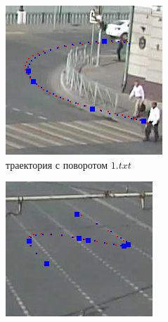 \begin{figure}[!htb]
\begin{subfigure}[!htb]{0.3\textwidth}
	\end{subfigure}
	\hfill
	\begin{subfigure}[!htb]{0.3\textwidth}
		\centering{}
		\includegraphics[width=\textwidth]{images/regr_kp_turn.png}
		\caption{траектория с поворотом $1.txt$}
	\end{subfigure}
	\hfill
	\begin{subfigure}[!htb]{0.3\textwidth}
		\centering{}
		\includegraphics[width=\textwidth]{images/regr_kp_complex.png}

\end{subfigure}
\end{figure}

